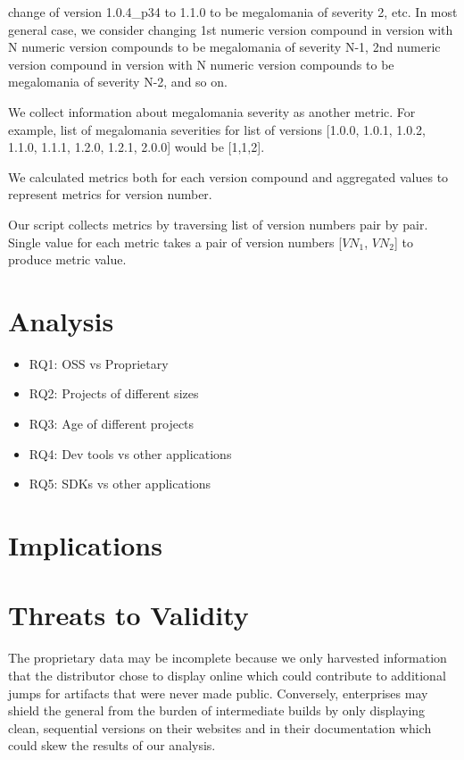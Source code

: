 \documentclass[conference]{IEEEtran}
\begin{document}
change of version 1.0.4\_p34 to 1.1.0 to be megalomania of severity 2, etc. In most general case, we consider changing 1st numeric version compound in version with N numeric version compounds to be megalomania of severity N-1, 2nd numeric version compound in version with N numeric version compounds to be megalomania of severity N-2, and so on. 

We collect information about megalomania severity as another metric. For example, list of megalomania severities for list of versions [1.0.0, 1.0.1, 1.0.2, 1.1.0, 1.1.1, 1.2.0, 1.2.1, 2.0.0] would be [1,1,2].

We calculated metrics both for each version compound and aggregated values to represent metrics for  version number.

Our script collects metrics by traversing list of version numbers pair by pair. Single value for each metric takes a pair of version numbers [$VN_{1}$, $VN_{2}$] to produce metric value.

\section{Analysis}

\begin{itemize}
\item RQ1: OSS vs Proprietary
\item RQ2: Projects of different sizes
\item RQ3: Age of different projects
\item RQ4: Dev tools vs other applications
\item RQ5: SDKs vs other applications 
\end{itemize}


\section{Implications}

\section{Threats to Validity}

 The proprietary data may be incomplete because we only harvested information that the distributor chose to display online which could contribute to additional jumps for artifacts that were never made public. Conversely, enterprises may shield the general from the burden of intermediate builds by only displaying clean, sequential versions on their websites and in their documentation which could skew the results of our analysis.
\end{document}
